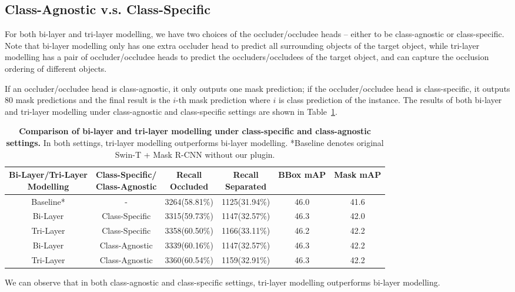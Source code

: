 \documentclass{bmvc2k}
\begin{document}
\subsection{Class-Agnostic v.s. Class-Specific}
\label{sec:sup_other_discussion_agnostic}


For both bi-layer and tri-layer modelling, we have two choices of the occluder/occludee heads -- either to be class-agnostic or class-specific. Note that bi-layer modelling only has one extra occluder head to predict all surrounding objects of the target object, while tri-layer modelling has a pair of occluder/occludee heads to predict the occluders/occludees of the target object, and  can capture the occlusion ordering of different objects.



If an occluder/occludee head is class-agnostic, it only outputs one mask prediction; if the occluder/occludee head is class-specific, it outputs 80 mask predictions and the final result is the $i$-th mask prediction where $i$ is class prediction of the instance. The results of both bi-layer and tri-layer modelling under class-agnostic and class-specific settings are shown in Table~\ref{table:sup_discussion_agnostic}.


\begin{table}[h]

\centering
\tabcolsep=0.08cm
\begin{tabular}{cccccc}
\toprule
  \thead{Bi-Layer/Tri-Layer \\ Modelling} & \thead{Class-Specific/ \\ Class-Agnostic} & \thead{Recall \\ Occluded} & \thead{Recall \\ Separated} & BBox mAP & Mask mAP  \\ \midrule
  Baseline* & - & 3264(58.81\%) & 1125(31.94\%) & 46.0 & 41.6 \\
  Bi-Layer & Class-Specific & 3315(59.73\%) & 1147(32.57\%) & 46.3 & 42.0 \\ 
  Tri-Layer & Class-Specific & 3358(60.50\%) & 1166(33.11\%) & 46.2 & 42.2 \\ 
  Bi-Layer & Class-Agnostic & 3339(60.16\%) & 1147(32.57\%) & 46.3 & 42.2 \\ 
  Tri-Layer & Class-Agnostic & 3360(60.54\%) & 1159(32.91\%) & 46.3 & 42.2 \\ \bottomrule
\end{tabular}
\vspace{.4cm}
\caption{\color{bmvc_blue} \textbf{Comparison of bi-layer and tri-layer modelling under class-specific and class-agnostic settings.} In both settings, tri-layer modelling outperforms bi-layer modelling. *Baseline denotes original Swin-T + Mask R-CNN without our plugin.}
\label{table:sup_discussion_agnostic}
\end{table}


We can observe that in both class-agnostic and class-specific settings, tri-layer modelling outperforms bi-layer modelling. 
 
\end{document}
